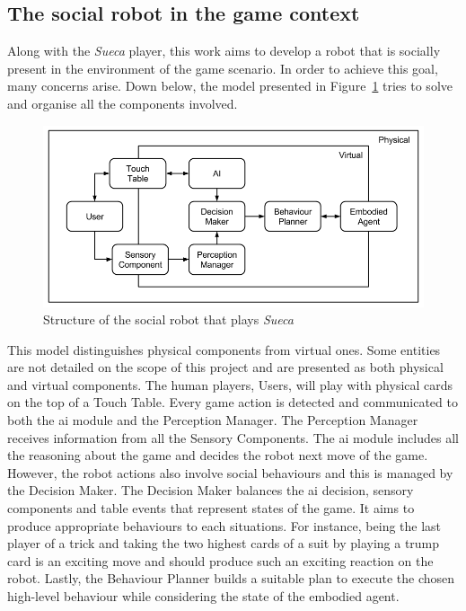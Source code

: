 \subsection{The social robot in the game context}
\label{sec:social_solution}

Along with the \emph{Sueca} player, this work aims to develop a robot that is socially present in the environment of the game scenario.
In order to achieve this goal, many concerns arise.
Down below, the model presented in Figure~\ref{fig:model} tries to solve and organise all the components involved.

\begin{figure}[ht]
  \centering
    \includegraphics[width=1\textwidth]{./img/model}
  \caption{Structure of the social robot that plays \emph{Sueca}}
\label{fig:model}
\end{figure}

This model distinguishes physical components from virtual ones.
Some entities are not detailed on the scope of this project and are presented as both physical and virtual components.
The human players, Users, will play with physical cards on the top of a Touch Table.
Every game action is detected and communicated to both the \gls{ai} module and the Perception Manager.
The Perception Manager receives information from all the Sensory Components.
The \gls{ai} module includes all the reasoning about the game and decides the robot next move of the game.
However, the robot actions also involve social behaviours and this is managed by the Decision Maker.
The Decision Maker balances the \gls{ai} decision, sensory components and table events that represent states of the game.
It aims to produce appropriate behaviours to each situations.
For instance, being the last player of a trick and taking the two highest cards of a suit by playing a trump card is an exciting move and should produce such an exciting reaction on the robot.
Lastly, the Behaviour Planner builds a suitable plan to execute the chosen high-level behaviour while considering the state of the embodied agent.

